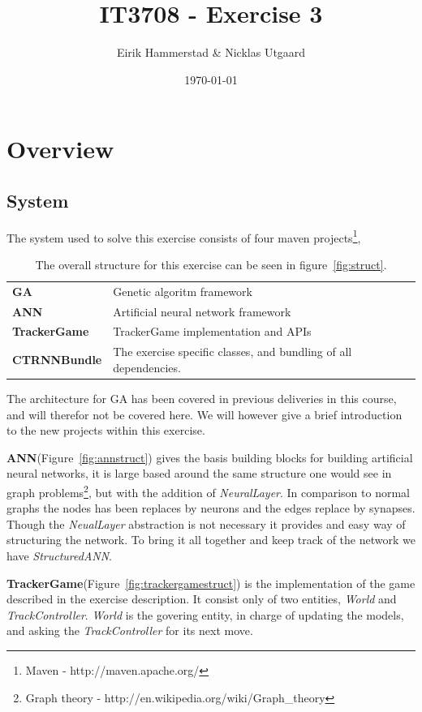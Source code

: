 \documentclass[10pt]{article}
\title{IT3708 - Exercise 3}
\author{
        Eirik Hammerstad \& Nicklas Utgaard
}
\date{\today}
\begin{document}
\maketitle
\section{Overview}
	\subsection{System}
		The system used to solve this exercise consists of four maven projects\footnote{Maven - http://maven.apache.org/}, 
		\begin{table}[H]
			\begin{tabular}{ll}
				\textbf{GA} & Genetic algoritm framework\\
				\textbf{ANN} & Artificial neural network framework\\
				\textbf{TrackerGame} & TrackerGame implementation and APIs\\
				\textbf{CTRNNBundle} & The exercise specific classes, and bundling of all dependencies.
			\end{tabular}
			\caption{The overall structure for this exercise can be seen in figure~\ref{fig:struct}.}
			\label{tabel:project}
		\end{table}
The architecture for GA has been covered in previous deliveries in this course, and will therefor not be covered here. We will however give a brief introduction to the new projects within this exercise. 
		
	\textbf{ANN}(Figure~\ref{fig:annstruct}) gives the basis building blocks for building artificial neural networks, it is large based around the same structure one would see in graph problems\footnote{Graph theory - http://en.wikipedia.org/wiki/Graph\_theory}, but with the addition of \textit{NeuralLayer}. In comparison to normal graphs the nodes has been replaces by neurons and the edges replace by synapses. Though the \textit{NeualLayer} abstraction is not necessary it provides and easy way of structuring the network. To bring it all together and keep track of the network we have \textit{StructuredANN}.

		\textbf{TrackerGame}(Figure~\ref{fig:trackergamestruct}) is the implementation of the game described in the exercise description. It consist only of two entities, \textit{World} and \textit{TrackController}. \textit{World} is the govering entity, in charge of updating the models, and asking the \textit{TrackController} for its next move. 
\end{document}
